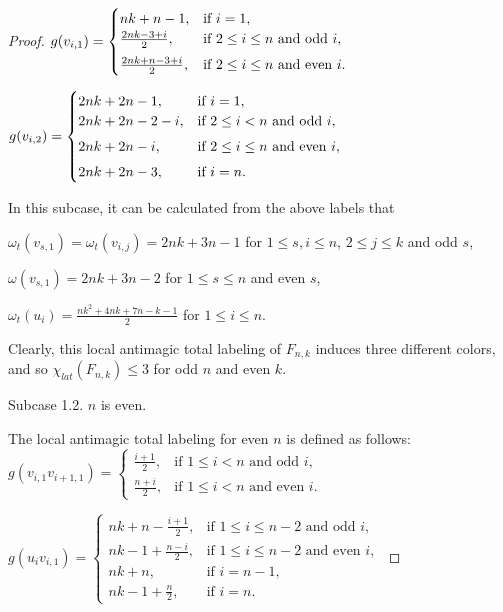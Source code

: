 \documentclass[10pt,a4paper]{amsart}
\begin{document}
\begin{proof}
$g(v_{i,1})=\begin{cases}
nk+n-1, & \text{if $ i=1$},\\
\frac{2nk-3+i}{2}, & \text{if $2\leq i\leq n$ and odd $i$},\\[4pt]
\frac{2nk+n-3+i}{2}, &\text{if $2\leq i\leq n$ and even $i$}.\end{cases}$\vspace{0.5em}

$g(v_{i,2})=\begin{cases}
2nk+2n-1, & \text{if $ i=1$},\\
2nk+2n-2-i, & \text{if $2\leq i< n$ and odd $i$},\\[4pt]
2nk+2n-i,  &\text{if $2\leq i\leq n$ and even $i$},\\[4pt]
2nk+2n-3, & \text{if $ i=n$}.\end{cases}$\vspace{0.6em}

In this subcase, it can be calculated from the above labels that

$\omega_{t}(v_{s,1})=\omega_{t}(v_{i,j})=2nk+3n-1$ for $1\leq s,i\leq n$, $2\leq j\leq k$ and odd $s$,

$\omega(v_{s,1})=2nk+3n-2$ for $1\leq s\leq n$ and even $s$,

$\omega_{t}(u_{i})=\frac{nk^{2}+4nk+7n-k-1}{2}$ for $1\leq i\leq n$.

Clearly, this local antimagic total labeling of $F_{n,k}$ induces three different colors, and so $\chi_{lat}(F_{n,k})\leq 3$ for odd $n$ and even $k$.

Subcase 1.2.  $n$ is even.

The local antimagic total labeling for even $n$ is defined as follows:\\

\vspace{-0.8em}
$g(v_{i,1}v_{i+1,1})=\begin{cases}
                       \frac{i+1}{2}, & \text{if $1\leq i<n$ and odd $i$},\\[4pt]
                       \frac{n+i}{2}, & \text{if $1\leq i<n$ and even $i$}.\end{cases}$\vspace{0.5em}

$g(u_{i}v_{i,1})=\begin{cases}
nk+n-\frac{i+1}{2}, & \text{if $1\leq i\leq n-2$ and odd $i$},\\[4pt]
nk-1+\frac{n-i}{2}, & \text{if $1\leq i\leq n-2$ and even $i$},\\[4pt]
nk+n,     &\text{if }i=n-1,\\[4pt]
nk-1+\frac{n}{2}, &\text{if }i=n.\end{cases}$\vspace{0.4em}


\end{proof}
\end{document}
